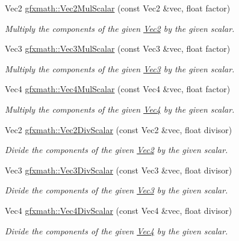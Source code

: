 \begin{DoxyCompactItemize}
Vec2 \hyperlink{group___s_i_s_d_vec_math_ga8e4fd4586284706a28625b0fca6c85e7}{gfxmath\+::\+Vec2\+Mul\+Scalar} (const Vec2 \&vec, float factor)
\begin{DoxyCompactList}\small\item\em Multiply the components of the given \hyperlink{classgfxmath_1_1_vec2}{Vec2} by the given scalar. \end{DoxyCompactList}\item 
Vec3 \hyperlink{group___s_i_s_d_vec_math_ga79475199c50b1ee42edc6aa8b5c5795f}{gfxmath\+::\+Vec3\+Mul\+Scalar} (const Vec3 \&vec, float factor)
\begin{DoxyCompactList}\small\item\em Multiply the components of the given \hyperlink{classgfxmath_1_1_vec3}{Vec3} by the given scalar. \end{DoxyCompactList}\item 
Vec4 \hyperlink{group___s_i_s_d_vec_math_ga70441f2888f0df752fe0624a5a7b362d}{gfxmath\+::\+Vec4\+Mul\+Scalar} (const Vec4 \&vec, float factor)
\begin{DoxyCompactList}\small\item\em Multiply the components of the given \hyperlink{classgfxmath_1_1_vec4}{Vec4} by the given scalar. \end{DoxyCompactList}\item 
Vec2 \hyperlink{group___s_i_s_d_vec_math_ga8686be4c3f0ee27b05363661fb75a228}{gfxmath\+::\+Vec2\+Div\+Scalar} (const Vec2 \&vec, float divisor)
\begin{DoxyCompactList}\small\item\em Divide the components of the given \hyperlink{classgfxmath_1_1_vec2}{Vec2} by the given scalar. \end{DoxyCompactList}\item 
Vec3 \hyperlink{group___s_i_s_d_vec_math_ga8c2d0c0b9d70b417e598489374ef1f88}{gfxmath\+::\+Vec3\+Div\+Scalar} (const Vec3 \&vec, float divisor)
\begin{DoxyCompactList}\small\item\em Divide the components of the given \hyperlink{classgfxmath_1_1_vec3}{Vec3} by the given scalar. \end{DoxyCompactList}\item 
Vec4 \hyperlink{group___s_i_s_d_vec_math_ga670f1f6ebdadeaa2f656f153218fdee8}{gfxmath\+::\+Vec4\+Div\+Scalar} (const Vec4 \&vec, float divisor)
\begin{DoxyCompactList}\small\item\em Divide the components of the given \hyperlink{classgfxmath_1_1_vec4}{Vec4} by the given scalar. \end{DoxyCompactList}\item 

\end{DoxyCompactItemize}
